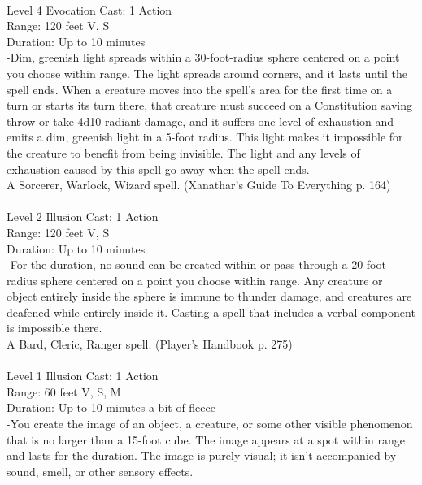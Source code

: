 \documentclass[10pt,twocolumn]{report}
\begin{document}
 \\
Level 4 \quad Evocation \quad Cast: 1 Action\\
Range: 120 feet \quad V, S\\
Duration: Up to 10 minutes \quad \\
-Dim, greenish light spreads within a 30-foot-radius sphere centered on a point you choose within range. The light spreads around corners, and it lasts until the spell ends.
When a creature moves into the spell’s area for the first time on a turn or starts its turn there, that creature must succeed on a Constitution saving throw or take 4d10 radiant damage, and it suffers one level of exhaustion and emits a dim, greenish light in a 5-foot radius. This light makes it impossible for the creature to benefit from being invisible. The light and any levels of exhaustion caused by this spell go away when the spell ends.\\
A Sorcerer, Warlock, Wizard spell. (Xanathar's Guide To Everything p. 164) \\


 \\
Level 2 \quad Illusion \quad Cast: 1 Action\\
Range: 120 feet \quad V, S\\
Duration: Up to 10 minutes \quad \\
-For the duration, no sound can be created within or pass through a 20-foot-radius sphere centered on a point you choose within range. Any creature or object entirely inside the sphere is immune to thunder damage, and creatures are deafened while entirely inside it. Casting a spell that includes a verbal component is impossible there.\\
A Bard, Cleric, Ranger spell. (Player's Handbook p. 275) \\


 \\
Level 1 \quad Illusion \quad Cast: 1 Action\\
Range: 60 feet \quad V, S, M\\
Duration: Up to 10 minutes \quad a bit of fleece\\
-You create the image of an object, a creature, or some other visible phenomenon that is no larger than a 15-foot cube. The image appears at a spot within range and lasts for the duration. The image is purely visual; it isn’t accompanied by sound, smell, or other sensory effects.
\end{document}
